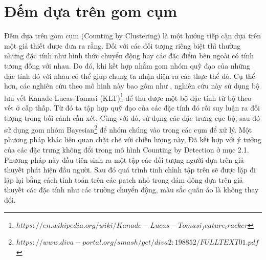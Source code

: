 \section{Đếm dựa trên gom cụm}
	Đếm dựa trên gom cụm (Counting by Clustering) là một hướng tiếp cận dựa trên một giả thiết được đưa ra rằng. Đối với các đối tượng riêng biệt thì thường những đặc tính như hình thức chuyển động hay các đặc điểm bên ngoài có tính tương đồng với nhau. Do đó, khi kết hợp nhằm gom nhóm quỹ đạo của những đặc tính đó với nhau có thể giúp chung ta nhận diện ra các thực thể đó. Cụ thể hơn, các nghiên cứu theo mô hình này bao gồm như \cite{Rabaud2006CountingCM}, nghiên cứu này sử dụng bộ lưu vết Kanade-Lucas-Tomasi (KLT)\footnote{$https://en.wikipedia.org/wiki/Kanade-Lucas-Tomasi_feature_tracker$} để thu được một bộ đặc tính từ bộ theo vết ở cấp thấp. Từ đó ta tập hợp quỹ đạo của các đặc tính đó rồi suy luận ra đối tượng trong bối cảnh cần xét. Cùng với đó, \cite{brostow2006unsupervised} sử dụng các đặc trưng cục bộ, sau đó sử dụng gom nhóm Bayesian\footnote{$https://www.diva-portal.org/smash/get/diva2:198852/FULLTEXT01.pdf$}
để nhóm chúng vào trong các cụm để xử lý. Một phương pháp khác liên quan chặt chẽ với chiến lượng này, \cite{tu2008unified} Đã kết hợp với ý tưởng của các đặc trưng không đổi trong mô hình Counting by Detection ở mục 2.1. Phương pháp này đầu tiên sinh ra một tập các đối tượng người dựa trên giả thuyết phát hiện đầu người. Sau đó quá trình tinh chỉnh tập trên sẽ được lặp đi lặp lại bằng cách tính toán trên các patch nhỏ trong đám đông dựa trên giả thuyết các đặc tính như các trường chuyển động, màu sắc quần áo là không thay đổi. \par

